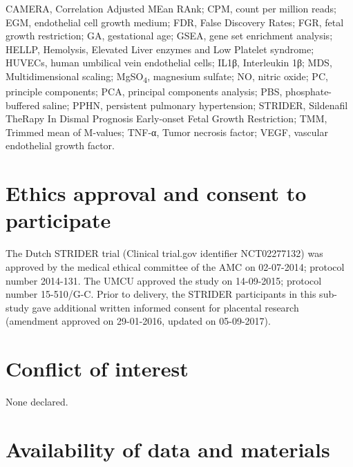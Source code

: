 \documentclass[authordate, empirical]{jote-new-article}
\begin{document}
CAMERA, Correlation Adjusted MEan RAnk; CPM, count per million reads; EGM, endothelial cell growth medium; FDR, False Discovery Rates; FGR, fetal growth restriction; GA, gestational age; GSEA, gene set enrichment analysis; HELLP, Hemolysis, Elevated Liver enzymes and Low Platelet syndrome; HUVECs, human umbilical vein endothelial cells; IL1β, Interleukin 1β; MDS, Multidimensional scaling; MgSO\textsubscript{4}, magnesium sulfate; NO, nitric oxide; PC, principle components; PCA, principal components analysis; PBS, phosphate-buffered saline; PPHN, persistent pulmonary hypertension; STRIDER, Sildenafil TheRapy In Dismal Prognosis Early-onset Fetal Growth Restriction; TMM, Trimmed mean of M-values; TNF-α, Tumor necrosis factor; VEGF, vascular endothelial growth factor.















\section{Ethics approval and consent to participate}



The Dutch STRIDER trial (Clinical trial.gov identifier NCT02277132) was approved by the medical ethical committee of the AMC on 02-07-2014; protocol number 2014-131. The UMCU approved the study on 14-09-2015; protocol number 15-510/G-C. Prior to delivery, the STRIDER participants in this sub-study gave additional written informed consent for placental research (amendment approved on 29-01-2016, updated on 05-09-2017).







\section{Conflict of interest}



None declared.



\section{Availability of data and materials}
\end{document}
